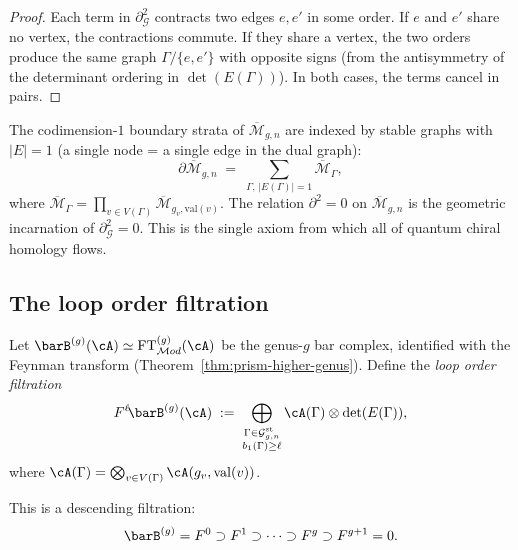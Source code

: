 \begin{proof}
Each term in $\partial_{\mathcal{G}}^2$ contracts two edges
$e, e'$ in some order. If $e$ and $e'$ share no vertex, the
contractions commute. If they share a vertex, the two orders
produce the same graph $\Gamma / \{e, e'\}$ with opposite signs
(from the antisymmetry of the determinant ordering in
$\det(E(\Gamma))$). In both cases, the terms cancel in pairs.
\end{proof}

\begin{remark}%
\label{rem:boundary-strata-stable-graph}
The codimension-$1$ boundary strata of $\overline{\mathcal{M}}_{g,n}$
are indexed by stable graphs with $|E| = 1$
(a single node = a single edge in the dual graph):
\[
\partial\overline{\mathcal{M}}_{g,n}
\;=\;
\sum_{\Gamma,\, |E(\Gamma)| = 1}
\overline{\mathcal{M}}_\Gamma,
\]
where $\overline{\mathcal{M}}_\Gamma =
\prod_{v \in V(\Gamma)} \overline{\mathcal{M}}_{g_v, \mathrm{val}(v)}$.
The relation $\partial^2 = 0$ on
$\overline{\mathcal{M}}_{g,n}$ is the geometric incarnation of
$\partial_{\mathcal{G}}^2 = 0$. This is the single axiom from
which all of quantum chiral homology flows.
\end{remark}

\subsection{The loop order filtration}
\label{subsec:loop-order-filtration}

\begin{definition}%
\label{def:loop-order-filtration}
Let $\barB^{(g)}(\cA)
\simeq \mathrm{FT}^{(g)}_{\mathcal{M}od}(\cA)$ be the genus-$g$
bar complex, identified with the Feynman transform
(Theorem~\ref{thm:prism-higher-genus}).
Define the \emph{loop order filtration}
\begin{equation}\label{eq:loop-filtration}
F^\ell\!\barB^{(g)}(\cA)
\;:=\;
\bigoplus_{\substack{\Gamma \in \mathcal{G}_{g,n}^{\mathrm{st}}
\\ b_1(\Gamma) \geq \ell}}
\cA(\Gamma) \otimes \det(E(\Gamma)),
\end{equation}
where $\cA(\Gamma) = \bigotimes_{v \in V(\Gamma)}
\cA(g_v, \mathrm{val}(v))$.

This is a descending filtration:
\[
\barB^{(g)} = F^0 \supset F^1 \supset \cdots \supset F^g \supset
F^{g+1} = 0.
\]
\end{definition}

